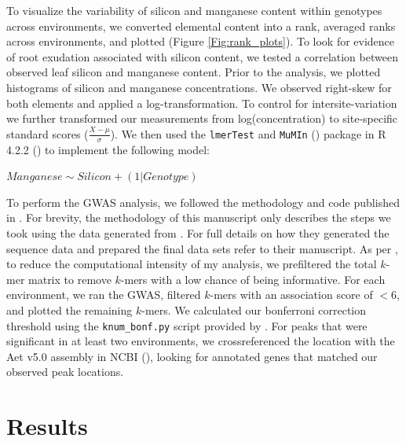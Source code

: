 \documentclass[12pt, letterpaper, ]{report}
\begin{document}
To visualize the variability of silicon and manganese content within genotypes across environments, we converted elemental content into a rank, averaged ranks across environments, and plotted (Figure \ref{Fig:rank_plots}). 
To look for evidence of root exudation associated with silicon content, we tested a correlation between observed leaf silicon and manganese content. Prior to the analysis, we plotted histograms of silicon and manganese concentrations. We observed right-skew for both elements and applied a log-transformation. To control for intersite-variation we further transformed our measurements from log(concentration) to site-specific standard scores ($\frac{X - \mu}{\sigma}$). We then used the \verb|lmerTest| and \verb|MuMIn| (\cite{kuznetsova_2017_lmerTest,barton_2023_mumin}) package in R 4.2.2 (\cite{r_core_team_2022}) to implement the following model: 

$Manganese \sim Silicon + (1|Genotype)$

To perform the GWAS analysis, we followed the methodology and code published in \textcite{gaurav_population_2022}. For brevity, the methodology of this manuscript only describes the steps we took using the data generated from \textcite{gaurav_population_2022}. For full details on how they generated the sequence data and prepared the final data sets refer to their manuscript. As per \textcite{gaurav_population_2022}, to reduce the computational intensity of my analysis, we prefiltered the total $k$-mer matrix to remove $k$-mers with a low chance of being informative. For each environment, we ran the GWAS, filtered $k$-mers with an association score of $<6$, and plotted the remaining $k$-mers. We calculated our bonferroni correction threshold using the \verb|knum_bonf.py| script provided by \textcite{gaurav_population_2022}. For peaks that were significant in at least two environments, we crossreferenced the location with the Aet v5.0 assembly in NCBI (\cite{wang_aegilops_2021}), looking for annotated genes that matched our observed peak locations.  

\section{Results}
\end{document}
